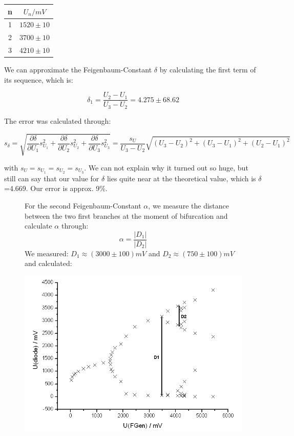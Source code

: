 \begin{center}
\begin{tabular}{c c}
n & $U_n / mV$\\ \hline
1 & $1520 \pm 10$\\
2 & $3700 \pm 10$\\
3 & $4210 \pm 10$
\end{tabular}
\end{center}

We can approximate the Feigenbaum-Constant $\delta$ by calculating the first term of its sequence, which is:

$$\boxed{\delta_1 = \frac{U_2-U_1}{U_3-U_2} = 4.275 \pm 68.62}$$

The error was calculated through:

$$s_\delta = \sqrt{\frac{\partial \delta}{\partial U_1}s_{U_1}^2 + \frac{\partial \delta}{\partial U_2}s_{U_2}^2 + \frac{\partial \delta}{\partial U_3}s_{U_3}^2} 
= \frac{s_U}{U_3-U_2}\sqrt{(U_3-U_2)^2 + (U_3-U_1)^2 + (U_2-U_1)^2}$$

with $s_U = s_{U_1} = s_{U_2} = s_{U_3}$. We can not explain why it turned out so huge, but still can say that our value for $\delta$ lies quite near at the theoretical value, which is $\delta$=4.669. Our error is approx. 9\%.

\begin{figure}[H]
\begin{minipage}{0.4\textwidth}
For the second Feigenbaum-Constant $\alpha$, we measure the distance between the two first branches at the moment of bifurcation and calculate $\alpha$ through:
$$\alpha = \frac{|D_1|}{|D_2|}$$
We measured: $D_1 \approx (3000 \pm 100) mV$ and $D_2 \approx (750\pm 100) mV$ and calculated:
\end{minipage}
\begin{minipage}{0.6\textwidth}
\centering \includegraphics[width=\textwidth]{Bilder/bifdiagD.png}
\end{minipage}
\end{figure}

